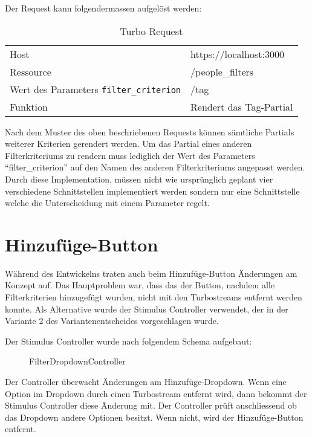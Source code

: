Der Request kann folgendermassen aufgelöst werden:

\begin{table}[h!]
   \begin{tabular}{|L{0.4\textwidth}|L{0.6\textwidth}|}
       \hline
         \\[12pt]
       \hline
        Host & https://localhost:3000 \\
       \hline
       Ressource & /people\_filters \\
       \hline
        Wert des Parameters \texttt{filter\_criterion} & /tag \\
       \hline
       Funktion & Rendert das Tag-Partial \\
     \hline
     \end{tabular}
     \caption{Turbo Request}
\end{table}

Nach dem Muster des oben beschriebenen Requests können sämtliche Partials weiterer Kriterien gerendert werden.
Um das Partial eines anderen Filterkriteriums zu rendern muss lediglich der Wert des Parameters ``filter\_criterion'' auf
den Namen des anderen Filterkriteriums angepasst werden. Durch diese Implementation, müssen nicht wie ursprünglich geplant
vier verschiedene Schnittstellen implementiert werden sondern nur eine Schnittstelle welche die Unterscheidung mit einem Parameter regelt.

\newpage

\section{Hinzufüge-Button}
Während des Entwickelns traten auch beim Hinzufüge-Button Änderungen am Konzept auf. Das Hauptproblem war, dass 
das der Button, nachdem alle Filterkriterien hinzugefügt wurden, nicht mit den Turbostreams entfernt werden konnte. 
Als Alternative wurde der Stimulus Controller verwendet, der in der Variante 2 des Variantenentscheides vorgeschlagen wurde.

Der Stimulus Controller wurde nach folgendem Schema aufgebaut:

\begin{figure}[h]
   \centering
   \caption{FilterDropdownController}
\end{figure}


Der Controller überwacht Änderungen am Hinzufüge-Dropdown. Wenn eine Option im Dropdown durch
einen Turbostream entfernt wird, dann bekommt der Stimulus Controller diese Änderung mit. Der Controller prüft anschliessend ob das Dropdown andere Optionen besitzt.
Wenn nicht, wird der Hinzufüge-Button entfernt. 

